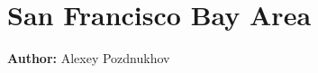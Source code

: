 \chapter{San Francisco Bay Area}
\label{ch:sanfrancisco}
\hfill \textbf{Author:} Alexey Pozdnukhov

